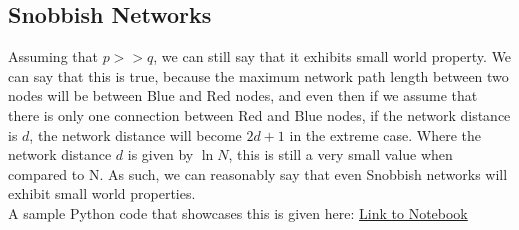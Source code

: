 \documentclass[11pt]{article}
\begin{document}
\subsection{Snobbish Networks}
Assuming that $ p >> q $, we can still say that it exhibits small world property. We can say that this is true, because the maximum network path length between two nodes will be between Blue and Red nodes, and even then if we assume that there is only one connection between Red and Blue nodes, if the network distance is $d$, the network distance will become $2d + 1$ in the extreme case. Where the network distance $d$ is given by $\ln{N}$, this is still a very small value when compared to N. As such, we can reasonably say that even Snobbish networks will exhibit small world properties.\\
A sample Python code that showcases this is given here: \href{https://colab.research.google.com/drive/1WSJCAuKiGnRM3uf4ftNwsbB8xiSTxdVr?usp=sharing}{Link to Notebook}
\end{document}
